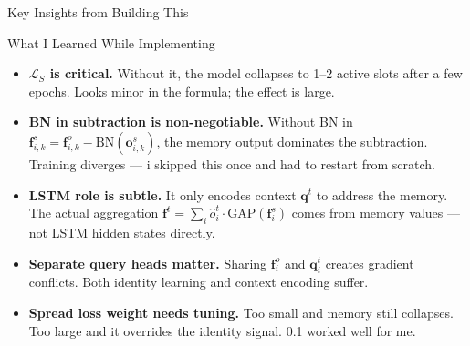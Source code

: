 \documentclass[aspectratio=169]{beamer}
\newcommand{\bt}[1]{\textbf{#1}}
\begin{document}
\begin{frame}{Key Insights from Building This}
  \begin{block}{What I Learned While Implementing}
    \small
    \begin{itemize}\setlength\itemsep{4pt}
      \item \bt{$\mathcal{L}_S$ is critical.} Without it, the model collapses to 1--2 active slots after a few epochs. Looks minor in the formula; the effect is large.

      \item \bt{BN in subtraction is non-negotiable.} Without BN in
            $\mathbf{f}^s_{i,k} = \mathbf{f}^o_{i,k} - \mathrm{BN}(\mathbf{o}^s_{i,k})$,
            the memory output dominates the subtraction. Training diverges --- i skipped this once and had to restart from scratch.

      \item \bt{LSTM role is subtle.} It only encodes context $\mathbf{q}^t$ to address the memory. The actual aggregation $\mathbf{f}^t = \sum_i \hat{o}^t_i \cdot \mathrm{GAP}(\mathbf{f}^s_i)$ comes from memory values --- not LSTM hidden states directly.

      \item \bt{Separate query heads matter.} Sharing $\mathbf{f}^o_i$ and $\mathbf{q}^t_i$ creates gradient conflicts. Both identity learning and context encoding suffer.

      \item \bt{Spread loss weight needs tuning.} Too small and memory still collapses. Too large and it overrides the identity signal. 0.1 worked well for me.
    \end{itemize}
  \end{block}
\end{frame}
\end{document}
